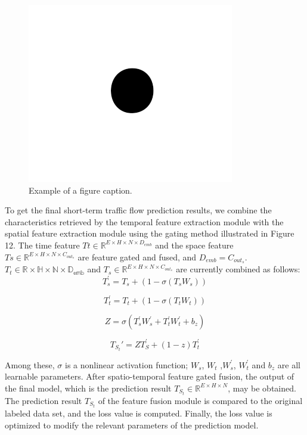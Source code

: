 \documentclass[conference]{IEEEtran}
\begin{document}
\begin{figure}[htbp]
    \centerline{\includegraphics{fig1.png}}
    \caption{Example of a figure caption.}
    \label{fig}
\end{figure}

\par
To get the final short-term traffic flow prediction results, we combine the characteristics retrieved by the temporal feature extraction module with the spatial feature extraction module using the gating method illustrated in Figure 12. The time feature $Tt \in \mathbb{R} ^ {E \times H \times N \times D_{emb}}$ and the space feature $Ts \in \mathbb{R} ^ {E \times H \times N \times C_{out_{s}}}$ are feature gated and fused, and $D_{emb} = C_{out_s}$. $T_t \in \mathbb{R \times H \times N \times D_{emb}}$ and $T_s \in \mathbb{R} ^ {E \times H \times N \times C_{out_s}} $ are currently combined as follows:
\begin{equation}
    T_s^{\prime}= T_s + (1 - \sigma(T_sW_s))
\end{equation}

\begin{equation}
    T_t^{\prime}= T_t + (1 - \sigma(T_tW_t))
\end{equation}

\begin{equation}
    Z = \sigma(T_s^{\prime}W_s^{\prime} + T^{\prime}_tW^{\prime}_t + b_z)
\end{equation}

\begin{equation}
    T_{S_t}{\prime}= ZT_S^{\prime} + (1 - z)T_t^{\prime}
\end{equation}

Among these, $\sigma$ is a nonlinear activation function; $W_s$, $W_t$ ,$W^{\prime}_s$, $W^{\prime}_t$ and $b_z$ are all learnable parameters. After spatio-temporal feature gated fusion, the output of the final model, which is the prediction result $T_{S_t} \in \mathbb{R} ^ {E \times H \times N}$, may be obtained. The prediction result $T_{S_t}$ of the feature fusion module is compared to the original labeled data set, and the loss value is computed. Finally, the loss value is optimized to modify the relevant parameters of the prediction model.
\end{document}
